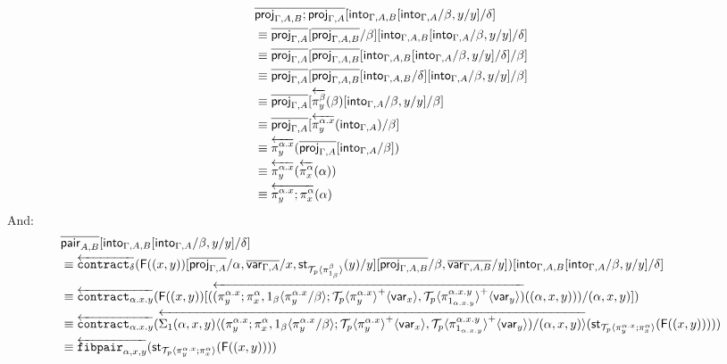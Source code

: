 \documentclass[10pt]{article}
\theoremstyle{definition}
\newcommand{\rewrite}[2]{\overleftarrow{#1}(#2)}
\newcommand\StI[2]{\ensuremath{\mathsf{st}_{#1}(#2)}}
\newcommand\FI[1]{\ensuremath{\mathsf{F}{(#1)}}}
\newcommand\ApEl[2]{\mathcal{T}_{#1}\langle#2\rangle}
\newcommand\ap[2]{\ensuremath{#1 \langle #2 \rangle }}
\newcommand\ApPlus[2]{\ensuremath{{#1}^+ \langle #2 \rangle }}
\begin{document}
\begin{enumerate}[style = multiline, labelwidth = 80pt]
\begin{align*}
&\upstairs{\proj{\Gamma, A, B};\proj{\Gamma, A}}[\into{\Gamma, A, B}[\into{\Gamma, A}/\beta, y/y] /\delta] \\
&\equiv \upstairs{\proj{\Gamma, A}}[\upstairs{\proj{\Gamma, A, B}}/\beta][\into{\Gamma, A, B}[\into{\Gamma, A}/\beta, y/y] /\delta] \\
&\equiv \upstairs{\proj{\Gamma, A}}[\upstairs{\proj{\Gamma, A, B}}[\into{\Gamma, A, B}[\into{\Gamma, A}/\beta, y/y] /\delta]/\beta] \\
&\equiv \upstairs{\proj{\Gamma, A}}[\upstairs{\proj{\Gamma, A, B}}[\into{\Gamma, A, B} /\delta][\into{\Gamma, A}/\beta, y/y]/\beta] \\
&\equiv \upstairs{\proj{\Gamma, A}}[\rewrite{\pi^\beta_y}{\beta}[\into{\Gamma, A}/\beta, y/y]/\beta] \\
&\equiv \upstairs{\proj{\Gamma, A}}[\rewrite{\pi^{\alpha.x}_y}{\into{\Gamma, A}}/\beta] \\
&\equiv \rewrite{\pi^{\alpha.x}_y}{\upstairs{\proj{\Gamma, A}}[\into{\Gamma, A}/\beta]} \\
&\equiv \rewrite{\pi^{\alpha.x}_y}{\rewrite{\pi^\alpha_x}{\alpha}} \\
&\equiv \rewrite{\pi^{\alpha.x}_y;\pi^\alpha_x}{\alpha}
\end{align*}
And:
\begin{align*}
&\upstairs{\qpair{A,B}}[\into{\Gamma, A, B}[\into{\Gamma, A}/\beta, y/y] /\delta] \\
&\equiv \rewrite{\contract{\delta}}{\FI{(x, y)}[\upstairs{\proj{\Gamma, A}}/\alpha, \upstairs{\var{\Gamma, A}}/x, \StI{\ApEl{p}{\pi^{\beta}_{1_{\beta}}}}{y}/y][\upstairs{\proj{\Gamma, A, B}}/\beta, \upstairs{\var{\Gamma, A, B}}/y]}[\into{\Gamma, A, B}[\into{\Gamma, A}/\beta, y/y] /\delta] \\
&\equiv \rewrite{\contract{\alpha.x.y}}{\FI{(x, y)}[(\rewrite{(\pi^{\alpha.x}_y;\pi^{\alpha}_x,\ap{1_\beta}{\pi^{\alpha.x}_y/\beta};\ApPlus{\ApEl{p}{\pi^{\alpha.x}_y}}{\var{x}}, \ApPlus{\ApEl{p}{\pi^{\alpha.x.y}_{1_{\alpha.x.y}}}}{\var{y}})}{(\alpha, x, y)})/(\alpha,x,y)]} \\
&\equiv \rewrite{\contract{\alpha.x.y}}{\rewrite{\ap{\Sigma_1(\alpha,x,y)}{(\pi^{\alpha.x}_y;\pi^{\alpha}_x,\ap{1_\beta}{\pi^{\alpha.x}_y/\beta};\ApPlus{\ApEl{p}{\pi^{\alpha.x}_y}}{\var{x}}, \ApPlus{\ApEl{p}{\pi^{\alpha.x.y}_{1_{\alpha.x.y}}}}{\var{y}})/(\alpha,x,y)}}{\StI{\ApEl{p}{\pi^{\alpha.x}_y;\pi^{\alpha}_x}}{\FI{(x, y)}}}} \\
&\equiv \rewrite{\fibpair{\alpha,x,y}}{\StI{\ApEl{p}{\pi^{\alpha.x}_y;\pi^{\alpha}_x}}{\FI{(x, y)}}}

\end{align*}
\end{enumerate}
\end{document}
